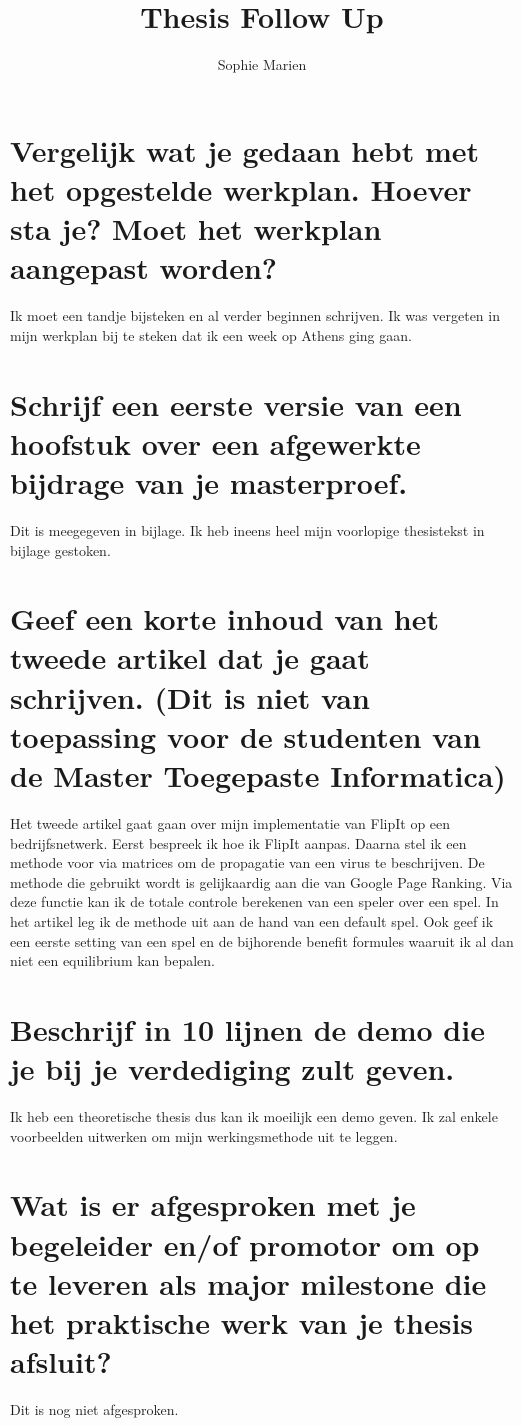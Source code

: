 \documentclass[a4paper, 11pt]{article}
\begin{document}
\begin{titlepage}
\title{Thesis Follow Up}
\author{Sophie Marien}
\date{} 
\end{titlepage}



\maketitle

\section{Vergelijk wat je gedaan hebt met het opgestelde werkplan. Hoever sta je? Moet het werkplan aangepast worden?}
Ik moet een tandje bijsteken en al verder beginnen schrijven. Ik was vergeten in mijn werkplan bij te steken dat ik een week op Athens ging gaan. 
\section{Schrijf een eerste versie van een hoofstuk over een afgewerkte bijdrage van je masterproef.}
Dit is meegegeven in bijlage. Ik heb ineens heel mijn voorlopige thesistekst in bijlage gestoken. 
\section{Geef een korte inhoud van het tweede artikel dat je gaat schrijven. (Dit is niet van toepassing voor de studenten van de Master Toegepaste Informatica)}
Het tweede artikel gaat gaan over mijn implementatie van FlipIt op een bedrijfsnetwerk. Eerst bespreek ik hoe ik FlipIt aanpas. Daarna stel ik een methode voor via matrices om de propagatie van een virus te beschrijven. De methode die gebruikt wordt is gelijkaardig aan die van Google Page Ranking. Via deze functie kan ik de totale controle berekenen van een speler over een spel. In het artikel leg ik de methode uit aan de hand van een default spel. 
Ook geef ik een eerste setting van een spel en de bijhorende benefit formules waaruit ik al dan niet een equilibrium kan bepalen.
\section{Beschrijf in 10 lijnen de demo die je bij je verdediging zult geven.}
Ik heb een theoretische thesis dus kan ik moeilijk een demo geven. Ik zal enkele voorbeelden uitwerken om mijn werkingsmethode uit te leggen.
\section{Wat is er afgesproken met je begeleider en/of promotor om op te leveren als major milestone die het praktische werk van je thesis afsluit?}
Dit is nog niet afgesproken.
\end{document}

